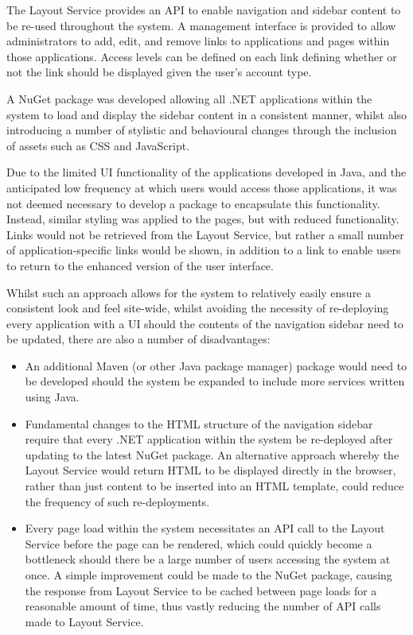 The Layout Service provides an API to enable navigation and sidebar content to be re-used throughout the system. A management interface is provided to allow administrators to add, edit, and remove links to applications and pages within those applications. Access levels can be defined on each link defining whether or not the link should be displayed given the user's account type.

A NuGet package was developed allowing all .NET applications within the system to load and display the sidebar content in a consistent manner, whilst also introducing a number of stylistic and behavioural changes through the inclusion of assets such as CSS and JavaScript.

Due to the limited UI functionality of the applications developed in Java, and the anticipated low frequency at which users would access those applications, it was not deemed necessary to develop a package to encapsulate this functionality. Instead, similar styling was applied to the pages, but with reduced functionality. Links would not be retrieved from the Layout Service, but rather a small number of application-specific links would be shown, in addition to a link to enable users to return to the enhanced version of the user interface.

Whilst such an approach allows for the system to relatively easily ensure a consistent look and feel site-wide, whilst avoiding the necessity of re-deploying every application with a UI should the contents of the navigation sidebar need to be updated, there are also a number of disadvantages:
\begin{itemize}
    \item An additional Maven (or other Java package manager) package would need to be developed should the system be expanded to include more services written using Java.
    \item Fundamental changes to the HTML structure of the navigation sidebar require that every .NET application within the system be re-deployed after updating to the latest NuGet package. An alternative approach whereby the Layout Service would return HTML to be displayed directly in the browser, rather than just content to be inserted into an HTML template, could reduce the frequency of such re-deployments.
    \item Every page load within the system necessitates an API call to the Layout Service before the page can be rendered, which could quickly become a bottleneck should there be a large number of users accessing the system at once. A simple improvement could be made to the NuGet package, causing the response from Layout Service to be cached between page loads for a reasonable amount of time, thus vastly reducing the number of API calls made to Layout Service.
\end{itemize}

